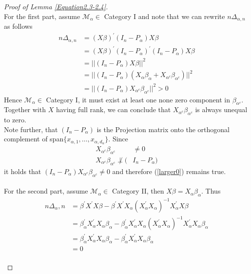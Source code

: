 \documentclass[Research_Module_ES.tex]{subfiles}
\begin{document}
\begin{proof}[Proof of Lemma \ref{Equation2.3-2.4}]~\\
	For the first part, assume $\mathcal{M}_\alpha\in$ Category I and note that we can rewrite $n\Delta_{\alpha,n}$ as follows
	\begin{align}\nonumber
	n\Delta_{\alpha,n}&= \left(X \beta \right)^\prime \left(I_n-P_\alpha\right)X\beta\\\nonumber
	&= \left(X \beta \right)^\prime \left(I_n-P_\alpha\right)^\prime\left(I_n-P_\alpha\right)X\beta\\\nonumber
	&=||\left(I_n-P_\alpha\right)X\beta||^2\\\nonumber
	&=||\left(I_n-P_\alpha\right)(X_\alpha\beta_\alpha+X_{\alpha^c}\beta_{\alpha^c})||^2\\
	&=||\left(I_n-P_\alpha\right)X_{\alpha^c}\beta_{\alpha^c}||^2>0 \label{larger0}
	\end{align}
	Hence 
	$\mathcal{M}_\alpha\in$ Category I, it must exist at least one none zero component in $\beta_{\alpha^c}$. Together with $X$ having full rank, we can conclude that $X_{\alpha^c}\beta_{\alpha^c}$ is always unequal to zero.\\ 
	Note further, that $(I_n-P_\alpha)$ is the Projection matrix onto the orthogonal complement of span$\{x_{\alpha,1},\ldots,x_{\alpha,d_\alpha}\}$. Since
	\begin{align*}
	X_{\alpha^c}\beta_{\alpha^c}&\neq 0\\
	X_{\alpha^c}\beta_{\alpha^c}\not\perp (&I_n-P_\alpha)
	\end{align*}
	it holds that $(I_n-P_\alpha) X_{\alpha^c}\beta_{\alpha^c}\neq 0$ and therefore (\ref{larger0}) remains true.\\
	\\
	For the second part, assume $\mathcal{M}_\alpha\in$ Category II, then $X\beta=X_\alpha\beta_\alpha$. Thus
	\begin{align*}
	n\Delta_\alpha,n&=\beta^\prime X^\prime X\beta-\beta^\prime X^\prime X_\alpha \left(X_\alpha^\prime X_\alpha\right)^{-1}X_\alpha^\prime X\beta\\
	&=\beta_\alpha^\prime X_\alpha^\prime X_\alpha \beta_\alpha -\beta_\alpha^\prime X_\alpha^\prime X_\alpha\left(X_\alpha^\prime X_\alpha\right)^{-1} X_\alpha^\prime X_\alpha\beta_\alpha\\
	&=\beta_\alpha^\prime X_\alpha^\prime X_\alpha \beta_\alpha - \beta_\alpha^\prime X_\alpha^\prime X_\alpha \beta_\alpha\\
	&=0
	\end{align*}\\
\end{proof}
\end{document}
